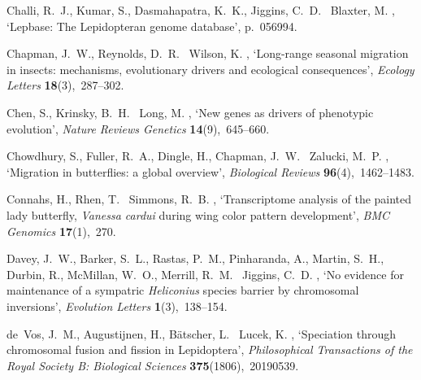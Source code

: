 \documentclass[twocolumn]{bmcart}%
\begin{document}
\begin{backmatter}
\begin{thebibliography}{xx}
Challi, R.~J., Kumar, S., Dasmahapatra, K.~K., Jiggins, C.~D. \harvardand\
  Blaxter, M.  \harvardyearright , `Lepbase: The
  {{Lepidopteran}} genome database',  p.~056994.

Chapman, J.~W., Reynolds, D.~R. \harvardand\ Wilson, K.  \harvardyearleft
  2015\harvardyearright , `Long-range seasonal migration in insects:
  mechanisms, evolutionary drivers and ecological consequences', {\em Ecology
  Letters} {\bf 18}(3),~287--302.

Chen, S., Krinsky, B.~H. \harvardand\ Long, M.  \harvardyearright , `New genes as drivers of phenotypic evolution', {\em
  Nature Reviews Genetics} {\bf 14}(9),~645--660.

Chowdhury, S., Fuller, R.~A., Dingle, H., Chapman, J.~W. \harvardand\ Zalucki,
  M.~P.  \harvardyearleft 2021\harvardyearright , `Migration in butterflies: a
  global overview', {\em Biological Reviews} {\bf 96}(4),~1462--1483.

Connahs, H., Rhen, T. \harvardand\ Simmons, R.~B.  \harvardyearleft
  2016\harvardyearright , `Transcriptome analysis of the painted lady
  butterfly, \textit{Vanessa cardui} during wing color pattern development',
  {\em BMC Genomics} {\bf 17}(1),~270.

Davey, J.~W., Barker, S.~L., Rastas, P.~M., Pinharanda, A., Martin, S.~H.,
  Durbin, R., McMillan, W.~O., Merrill, R.~M. \harvardand\ Jiggins, C.~D.
  \harvardyearleft 2017\harvardyearright , `No evidence for maintenance of a
  sympatric \textit{Heliconius} species barrier by chromosomal inversions',
  {\em Evolution Letters} {\bf 1}(3),~138--154.

de~Vos, J.~M., Augustijnen, H., Bätscher, L. \harvardand\ Lucek, K.
  \harvardyearleft 2020\harvardyearright , `Speciation through chromosomal
  fusion and fission in {{Lepidoptera}}', {\em Philosophical Transactions of
  the Royal Society B: Biological Sciences} {\bf 375}(1806),~20190539.


\end{thebibliography}
\end{backmatter}
\end{document}
